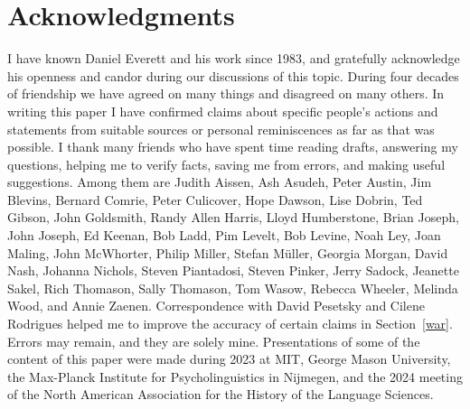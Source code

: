 \documentclass[output=paper,colorlinks,citecolor=brown
]{langscibook}
\begin{document}
\section*{Acknowledgments}
I have known Daniel Everett and his work since 1983, and gratefully
acknowledge his openness and candor during our discussions of this topic.
During four decades of friendship we have agreed on many things and
disagreed on many others. In writing this paper I have confirmed
claims about specific people's actions and statements from suitable
sources or personal reminiscences as far as that was possible.
I thank many friends who have spent time reading drafts, answering
my questions, helping me to verify facts, saving me from errors,
and making useful suggestions. Among them are
Judith Aissen,
Ash Asudeh,
Peter Austin,
Jim Blevins,
Bernard Comrie,
Peter Culicover,
Hope Dawson,
Lise Dobrin,
Ted Gibson,
John Goldsmith,
Randy Allen Harris,
Lloyd Humberstone,
Brian Joseph,
John Joseph,
Ed Keenan,
Bob Ladd,
Pim Levelt,
Bob Levine,
Noah Ley,
Joan Maling,
John McWhorter,
Philip Miller,
Stefan M{\"u}ller,
Georgia Morgan,
David Nash,
Johanna Nichols,
Steven Piantadosi,
Steven Pinker,
Jerry Sadock,
Jeanette Sakel,
Rich Thomason,
Sally Thomason,
Tom Wasow,
Rebecca Wheeler,
Melinda Wood, and
Annie Zaenen.
Correspondence with David Pesetsky and Cilene Rodrigues helped me to
improve the accuracy of certain claims in Section~\ref{war}.
Errors may remain, and they are solely mine.
Presentations of some of the content of this paper were made during
2023 at MIT, George Mason University, the Max-Planck Institute
for Psycholinguistics in Nijmegen, and the 2024 meeting of the
North American Association for the History of the Language Sciences.



\printbibliography[heading=subbibliography,notkeyword=this]
\end{document}
